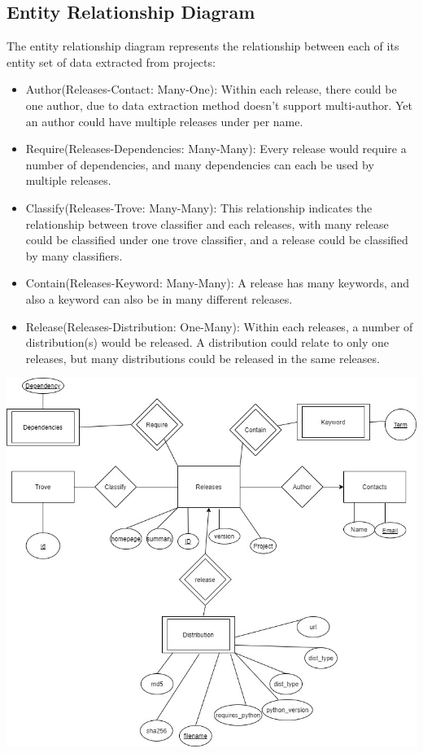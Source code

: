 \documentclass[a4paper,12pt]{article}
\begin{document}
\subsection{Entity Relationship Diagram}
The entity relationship diagram represents the relationship between each of
its entity set of data extracted from projects:
\begin{itemize}
  \item Author(Releases-Contact: Many-One): Within each release, there could be
    one author, due to data extraction method doesn't support multi-author.
    Yet an author could have multiple releases under per name.
  \item Require(Releases-Dependencies: Many-Many): Every release would require
    a number of dependencies, and many dependencies can each be used by
    multiple releases.
  \item Classify(Releases-Trove: Many-Many): This relationship indicates the
    relationship between trove classifier and each releases, with many release
    could be classified under one trove classifier, and a release could be
    classified by many classifiers.
  \item Contain(Releases-Keyword: Many-Many): A release has many keywords,
    and also a keyword can also be in many different releases.
  \item Release(Releases-Distribution: One-Many): Within each releases,
    a number of distribution(s) would be released.  A distribution could
    relate to only one releases, but many distributions could be released
    in the same releases.
\end{itemize}
\includegraphics[width=\textwidth]{erd.jpg}
\end{document}
